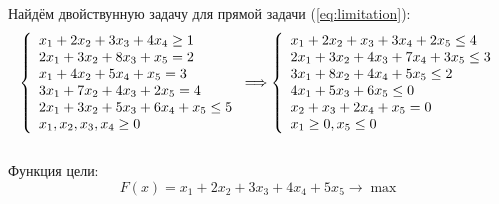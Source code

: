 \documentclass[../body.tex]{subfiles}
\begin{document}
	Найдём двойствунную задачу для прямой задачи (\ref{eq:limitation}):	
	\begin{equation} \label{eq:dualtask}
		\left\{
		\begin{array}{ll} 
			x_1+2x_2+3x_3+4x_4 \ge 1\\
			2x_1+3x_2+8x_3+x_5=2\\
			x_1+4x_2+5x_4+x_5=3\\
			3x_1+7x_2+4x_3+2x_5 = 4\\
			2x_1+3x_2+5x_3+6x_4+x_5 \le 5\\
			x_1,x_2,x_3,x_4 \ge 0
		\end{array}\\
		\right.
		\Longrightarrow
		\left\{
		\begin{array}{ll} 
			x_1+2x_2+x_3+3x_4+2x_5\le 4\\
			2x_1+3x_2+4x_3+7x_4+3x_5 \le 3\\
			3x_1+8x_2+4x_4+5x_5 \le 2\\
			4x_1+5x_3+6x_5 \le 0\\
			x_2+x_3+2x_4+x_5 = 0\\
			x_1\ge 0, x_5 \le 0
		\end{array}
		\right.	
	\end{equation}\\
	Функция цели: $$F(x)=x_1+2x_2+3x_3+4x_4+5x_5\longrightarrow \max
	$$
\end{document}
